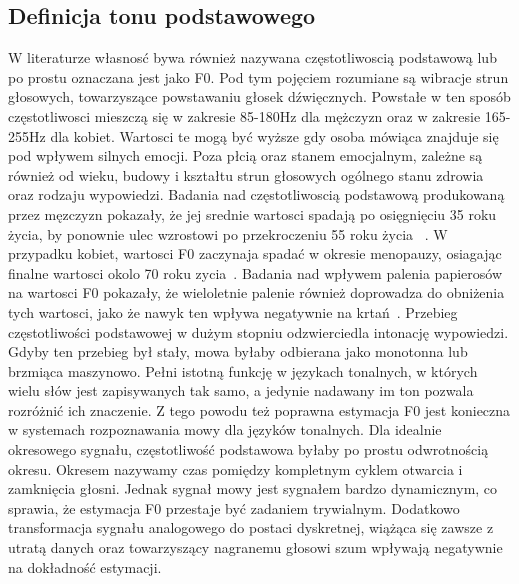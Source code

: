 \documentclass[a4paper,12 pt]{report}
\begin{document}
\subsection{Definicja tonu podstawowego}
W literaturze własnosć bywa również nazywana częstotliwoscią podstawową lub po prostu oznaczana jest jako F0. Pod tym pojęciem rozumiane są wibracje strun głosowych, towarzyszące powstawaniu głosek dźwięcznych. Powstałe w ten sposób częstotliwosci mieszczą się w zakresie 85-180Hz dla mężczyzn oraz w zakresie 165-255Hz dla kobiet. Wartosci te mogą być wyższe gdy osoba mówiąca znajduje się pod wpływem silnych emocji. Poza płcią oraz stanem emocjalnym, zależne są również od wieku, budowy i kształtu strun głosowych ogólnego stanu zdrowia oraz rodzaju wypowiedzi. Badania nad częstotliwoscią podstawową produkowaną przez męzczyzn pokazały, że jej srednie wartosci spadają po osięgnięciu 35 roku życia, by ponownie ulec wzrostowi po przekroczeniu 55 roku życia ~\cite{Hollien_Ship}. W przypadku kobiet, wartosci F0 zaczynaja spadać w okresie menopauzy, osiagając finalne wartosci okolo 70 roku zycia~\cite{Pegoraro-Krook}. Badania nad wpływem palenia papierosów na wartosci F0 pokazały, że wieloletnie palenie również doprowadza do obniżenia tych wartosci, jako że nawyk ten wpływa negatywnie na krtań~\cite{Gilbert}.
Przebieg częstotliwości podstawowej w dużym stopniu odzwierciedla intonację wypowiedzi. Gdyby ten przebieg był stały, mowa byłaby odbierana jako monotonna lub brzmiąca maszynowo.  Pełni istotną funkcję w językach tonalnych, w których wielu słów jest zapisywanych tak samo, a jedynie nadawany im ton pozwala rozróżnić ich znaczenie. Z tego powodu też poprawna estymacja F0 jest konieczna w systemach rozpoznawania mowy dla języków tonalnych.
Dla idealnie okresowego sygnału, częstotliwość podstawowa byłaby po prostu odwrotnością okresu. Okresem nazywamy czas pomiędzy kompletnym cyklem otwarcia i zamknięcia głosni. Jednak sygnał mowy jest sygnałem bardzo dynamicznym, co sprawia, że estymacja F0 przestaje być zadaniem trywialnym. Dodatkowo transformacja sygnału analogowego do postaci dyskretnej, wiążąca się zawsze z utratą danych oraz towarzyszący nagranemu głosowi szum wpływają negatywnie na dokładność estymacji. 
\end{document}
